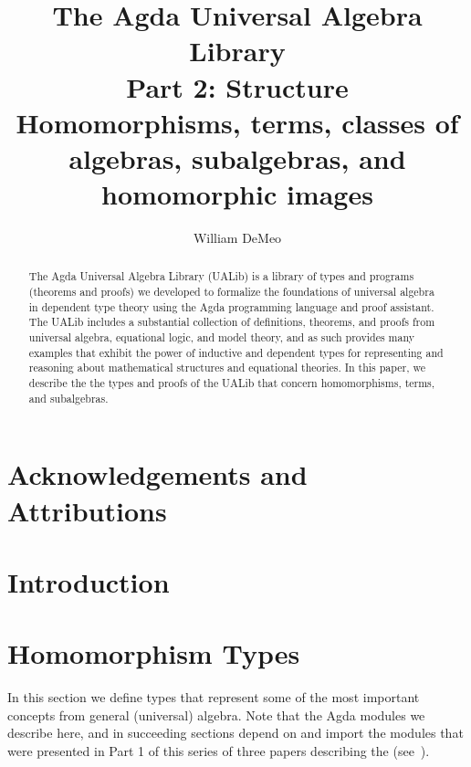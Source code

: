\documentclass[a4paper,UKenglish,cleveref,autoref,thm-restate,12pt]{../lipics-v2021-wjd}
\title{The Agda Universal Algebra Library\\%
Part 2: Structure\\[-5pt]
{\large Homomorphisms, terms, classes of algebras, subalgebras, and homomorphic images}}
\author{William DeMeo}
       {Department of Algebra, Charles University in Prague \and \url{https://williamdemeo.gitlab.io}}
       {williamdemeo@gmail.com}{https://orcid.org/0000-0003-1832-5690}{}
\begin{document}
\maketitle


\begin{abstract}
The Agda Universal Algebra Library (UALib) is a library of types and programs (theorems and proofs) we developed to formalize the foundations of universal algebra in dependent type theory using the Agda programming language and proof assistant. 
 The UALib includes a substantial collection of definitions, theorems, and proofs from universal algebra, equational logic, and model theory, and as such provides many examples that exhibit the power of inductive and dependent types for representing and reasoning about mathematical structures and equational theories. In this paper, we describe the the types and proofs of the UALib that concern homomorphisms, terms, and subalgebras.
\end{abstract}

\section*{Acknowledgements and Attributions}


\newpage

\setcounter{tocdepth}{2}
\tableofcontents

\section{Introduction}\label{sec:introduction}





\newcommand\firstsentence[2]{This section presents the #1 module of the \agdaualib.\footnote{For more details, see #2.}}

\section{Homomorphism Types}\label{sec:homomorphism-types}
In this section we define types that represent some of the most important concepts from general (universal) algebra.  Note that the Agda modules we describe here, and in succeeding sections depend on and import the modules that were presented in Part 1 of this series of three papers describing the \agdaualib (see~\cite{DeMeo:2021-1}). 
\end{document}
